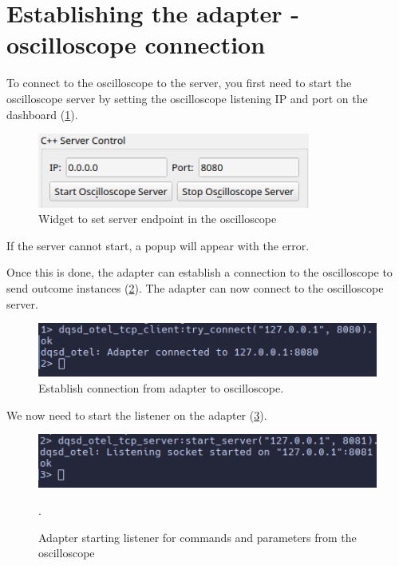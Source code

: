 \section{Establishing the adapter - oscilloscope connection}
    To connect to the oscilloscope to the server, you first need to start the oscilloscope server by setting the oscilloscope listening IP and port on the dashboard (\cref{fig:serv_endp}).

    \begin{figure}[H]
        \begin{center}
        \includegraphics[width = 0.8\textwidth]{img/manual/cserv.png}
        \end{center}
        \caption{Widget to set server endpoint in the oscilloscope}
        \label{fig:serv_endp}
    \end{figure}

    If the server cannot start, a popup will appear with the error.
    
    Once this is done, the adapter can establish a connection to the oscilloscope to send outcome instances (\cref{fig:est_con}). The adapter can now connect to the oscilloscope server.  
    
    \begin{figure}[H]
        \begin{center}
        \includegraphics[width = 0.8 \textwidth]{img/manual/connectadapter.png}
        \end{center}
        \caption{Establish connection from adapter to oscilloscope.}
        \label{fig:est_con}
    \end{figure}
    
    We now need to start the listener on the adapter (\cref{fig:est_list}).

     \begin{figure}[H]
        \begin{center}
        \includegraphics[width = 0.8 \textwidth]{img/manual/listener.png}
        \end{center}
         \caption{Adapter starting listener for commands and parameters from the oscilloscope}.
         \label{fig:est_list}
    \end{figure}

